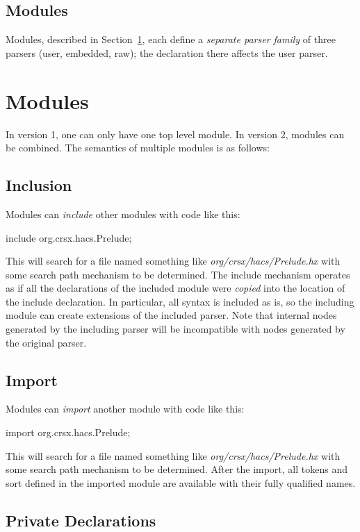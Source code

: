\documentclass[11pt]{article} %
\begin{document}
\subsection{Modules}

Modules, described in Section~\ref{sec:modules}, each define a \emph{separate parser family} of
three parsers (user, embedded, raw); the  declaration there affects the user parser.


\section{Modules}\label{sec:modules}

In version 1, one can only have one top level module. In version 2, modules can be combined.  The
semantics of multiple modules is as follows:

\subsection{Inclusion}

Modules can \emph{include} other modules with code like this:
\begin{hacs}
    include org.crsx.hacs.Prelude;
\end{hacs}
This will search for a file named something like \emph{org/crsx/hacs/Prelude.hx} with some search
path mechanism to be determined.  The include mechanism operates as if all the declarations of the
included module were \emph{copied} into the location of the include declaration.  In particular,
all syntax is included as is, so the including module can create extensions of the included
parser. Note that internal nodes generated by the including parser will be incompatible with nodes
generated by the original parser.

\subsection{Import}

Modules can \emph{import} another module with code like this:
\begin{hacs}
    import org.crsx.hacs.Prelude;
\end{hacs}
This will search for a file named something like \emph{org/crsx/hacs/Prelude.hx} with some search
path mechanism to be determined.  After the import, all tokens and sort defined in the imported
module are available with their fully qualified names.

\subsection{Private Declarations}
\end{document}
